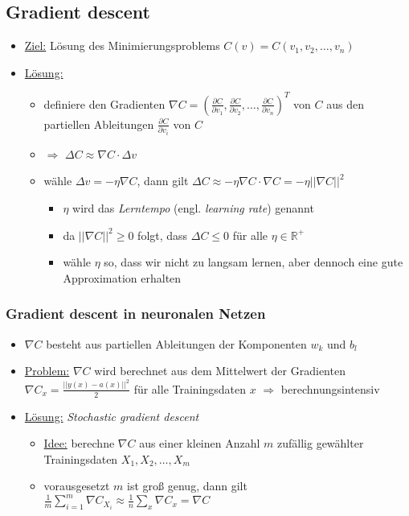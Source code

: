 \subsection{Gradient descent}

\begin{itemize}
  \item \underline{Ziel:} Lösung des Minimierungsproblems $C(v) = C(v_1, v_2, \ldots, v_n)$
  \item \underline{Lösung:}
  \begin{itemize}
    \item definiere den Gradienten $\nabla C  = {(\frac{\partial C}{\partial v_1}, \frac{\partial C}{\partial v_2}, \ldots, \frac{\partial C}{\partial v_n})}^T$ von $C$ aus den partiellen Ableitungen $\frac{\partial C}{\partial v_i}$ von $C$
    \item $\Rightarrow$ $\Delta C \approx \nabla  C \cdot \Delta v$
    \item wähle $\Delta v = - \eta \nabla C$, dann gilt $\Delta C \approx - \eta \nabla C \cdot \nabla C  = - \eta ||\nabla C||^2$
    \begin{itemize}
      \item $\eta$ wird das \emph{Lerntempo} (engl. \emph{learning rate}) genannt
      \item da $||\nabla C||^2 \geq 0$ folgt, dass $\Delta C \leq 0$ für alle $\eta \in \mathbb{R}^+$
      \item wähle $\eta$ so, dass wir nicht zu langsam lernen, aber dennoch eine gute Approximation erhalten
    \end{itemize}
  \end{itemize}
\end{itemize}

\subsubsection{Gradient descent in neuronalen Netzen}

\begin{itemize}
  \item $\nabla C$ besteht aus partiellen Ableitungen der Komponenten $w_k$ und $b_l$
  \item \underline{Problem:} $\nabla C$ wird berechnet aus dem Mittelwert der Gradienten $\nabla C_x = \frac{||y(x)-a(x)||^2}{2}$ für alle Trainingsdaten $x$ $\Rightarrow$ berechnungsintensiv
  \item \underline{Lösung:} \emph{Stochastic gradient descent}
  \begin{itemize}
    \item \underline{Idee:} berechne $\nabla C$ aus einer kleinen Anzahl $m$ zufällig gewählter Trainingsdaten $X_1, X_2, \ldots, X_m$
    \item vorausgesetzt $m$ ist groß genug, dann gilt $\frac{1}{m} \sum_{i=1}^m \nabla C_{X_i} \approx \frac{1}{n} \sum_x \nabla C_x = \nabla C$
  \end{itemize}
\end{itemize}
